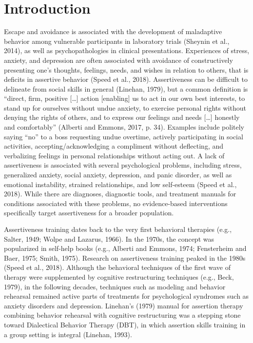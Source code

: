 \documentclass[preprint,
3p]{elsarticle} %
\begin{document}
\hypertarget{introduction}{%
\section{Introduction}\label{introduction}}

Escape and avoidance is associated with the development of maladaptive
behavior among vulnerable participants in laboratory trials (Sheynin et
al., 2014), as well as psychopathologies in clinical presentations.
Experiences of stress, anxiety, and depression are often associated with
avoidance of constructively presenting one's thoughts, feelings, needs,
and wishes in relation to others, that is deficits in assertive behavior
(Speed et al., 2018). Assertiveness can be difficult to delineate from
social skills in general (Linehan, 1979), but a common definition is
``direct, firm, positive {[}\ldots{]} action {[}enabling{]} us to act in
our own best interests, to stand up for ourselves without undue anxiety,
to exercise personal rights without denying the rights of others, and to
express our feelings and needs {[}\ldots{]} honestly and comfortably''
(Alberti and Emmons, 2017, p. 34). Examples include politely saying
``no'' to a boss requesting undue overtime, actively participating in
social activities, accepting/acknowledging a compliment without
deflecting, and verbalizing feelings in personal relationships without
acting out. A lack of assertiveness is associated with several
psychological problems, including stress, generalized anxiety, social
anxiety, depression, and panic disorder, as well as emotional
instability, strained relationships, and low self-esteem (Speed et al.,
2018). While there are diagnoses, diagnostic tools, and treatment
manuals for conditions associated with these problems, no evidence-based
interventions specifically target assertiveness for a broader
population.

Assertiveness training dates back to the very first behavioral therapies
(e.g., Salter, 1949; Wolpe and Lazarus, 1966). In the 1970s, the concept
was popularized in self-help books (e.g., Alberti and Emmons, 1974;
Fensterheim and Baer, 1975; Smith, 1975). Research on assertiveness
training peaked in the 1980s (Speed et al., 2018). Although the
behavioral techniques of the first wave of therapy were supplemented by
cognitive restructuring techniques (e.g., Beck, 1979), in the following
decades, techniques such as modeling and behavior rehearsal remained
active parts of treatments for psychological syndromes such as anxiety
disorders and depression. Linehan's (1979) manual for assertion therapy
combining behavior rehearsal with cognitive restructuring was a stepping
stone toward Dialectical Behavior Therapy (DBT), in which assertion
skills training in a group setting is integral (Linehan, 1993).
\end{document}
